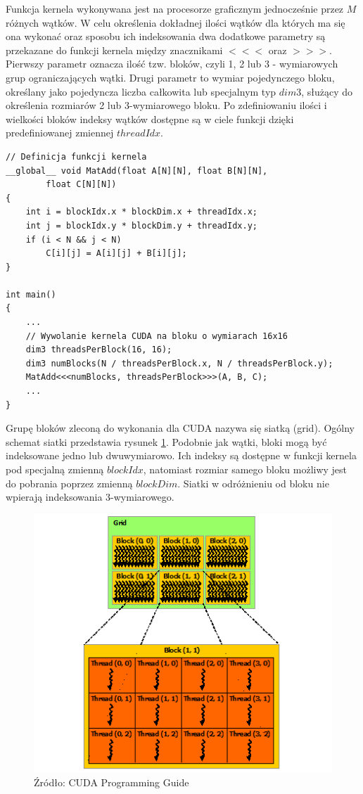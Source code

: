 Funkcja kernela wykonywana jest na procesorze graficznym jednocześnie przez $M$
różnych wątków. W celu określenia dokładnej ilości wątków dla których ma się ona
wykonać oraz sposobu ich indeksowania dwa dodatkowe parametry
są przekazane do funkcji kernela między znacznikami $<<<$ oraz $>>>$. Pierwszy parametr
oznacza ilość tzw. bloków, czyli 1, 2 lub 3 - wymiarowych grup ograniczających
wątki. Drugi parametr to wymiar pojedynczego bloku, określany jako pojedyncza liczba
całkowita lub specjalnym typ $dim3$, służący do określenia rozmiarów 2 lub
3-wymiarowego bloku. Po zdefiniowaniu ilości i wielkości bloków indeksy wątków dostępne
są w ciele funkcji dzięki predefiniowanej zmiennej $threadIdx$.

\begin{lstlisting}[caption=Dodawanie macierzy, label=kernel]
// Definicja funkcji kernela
__global__ void MatAdd(float A[N][N], float B[N][N],
		float C[N][N])
{
	int i = blockIdx.x * blockDim.x + threadIdx.x;
	int j = blockIdx.y * blockDim.y + threadIdx.y;
	if (i < N && j < N)
		C[i][j] = A[i][j] + B[i][j];
}

int main()
{
	...
	// Wywolanie kernela CUDA na bloku o wymiarach 16x16
	dim3 threadsPerBlock(16, 16);
	dim3 numBlocks(N / threadsPerBlock.x, N / threadsPerBlock.y);
	MatAdd<<<numBlocks, threadsPerBlock>>>(A, B, C);
	...
}
\end{lstlisting}

Grupę bloków zleconą do wykonania dla CUDA nazywa się siatką
(grid). Ogólny schemat siatki przedstawia rysunek \ref{grid}. Podobnie jak
wątki, bloki mogą być indeksowane jedno lub dwuwymiarowo. Ich indeksy są dostępne
w funkcji kernela pod specjalną zmienną $blockIdx$, natomiast rozmiar samego
bloku możliwy jest do pobrania poprzez zmienną $blockDim$. Siatki w odróżnieniu od bloku nie
wpierają indeksowania 3-wymiarowego.

\begin{figure}[ht]
\centering
\includegraphics[scale=0.8]{images/grid-of-thread-blocks.png}
\caption{Źródło: CUDA Programming Guide}
\label{grid}
\end{figure}

